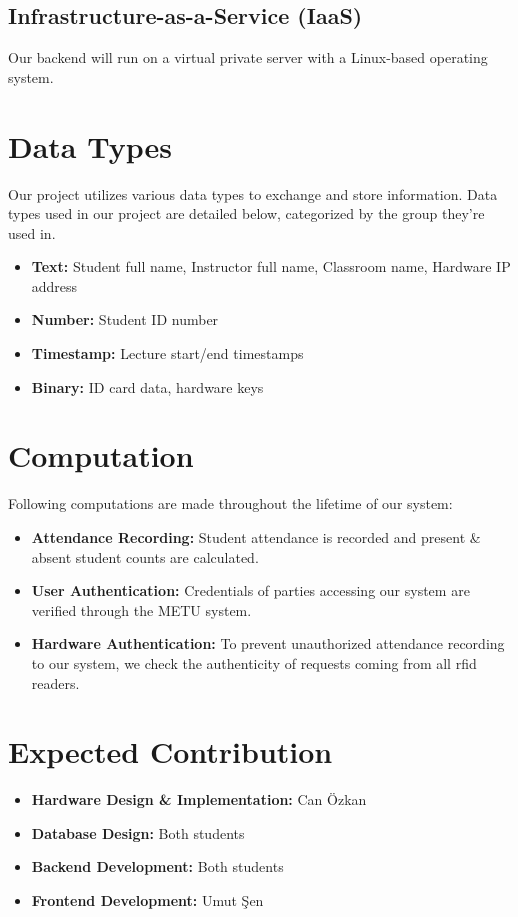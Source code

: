 \documentclass[12pt]{article}
\begin{document}
\subsection{Infrastructure-as-a-Service (IaaS)}
Our backend will run on a virtual private server with a Linux-based operating system.\supercite{vps-com-tr}



\newpage
\section{Data Types}
Our project utilizes various data types to exchange and store information. Data types used in our project are detailed below, categorized by the group they’re used in.

\begin{itemize}
    \item \textbf{Text:} Student full name, Instructor full name, Classroom name, Hardware IP address
    \item \textbf{Number:} Student ID number
    \item \textbf{Timestamp:} Lecture start/end timestamps
    \item \textbf{Binary:} ID card data, hardware keys
\end{itemize}



\section{Computation}
Following computations are made throughout the lifetime of our system:

\begin{itemize}
    \item \textbf{Attendance Recording:} Student attendance is recorded and present \& absent student counts are calculated.
    \item \textbf{User Authentication:} Credentials of parties accessing our system are verified through the METU system.
    \item \textbf{Hardware Authentication:} To prevent unauthorized attendance recording to our system, we check the authenticity of requests coming from all \gls{rfid} readers.
\end{itemize}



\section{Expected Contribution}
\begin{itemize}
    \item \textbf{Hardware Design \& Implementation:} Can Özkan
    \item \textbf{Database Design:} Both students
    \item \textbf{Backend Development:} Both students
    \item \textbf{Frontend Development:} Umut Şen
\end{itemize}
\end{document}
